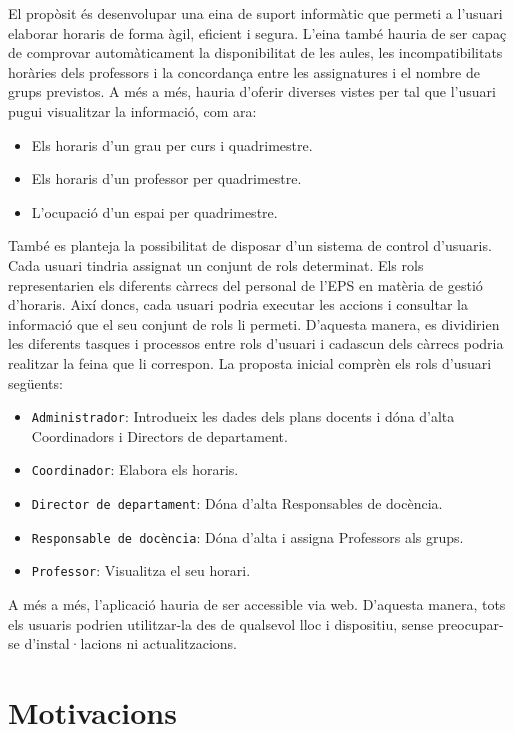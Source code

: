 \documentclass[a4paper,12pt]{ThesisStyle}
\begin{document}
El propòsit és desenvolupar una eina de suport informàtic que permeti a l'usuari elaborar horaris de forma àgil, eficient i segura. L'eina també hauria de ser capaç de comprovar automàticament la disponibilitat de les aules, les incompatibilitats horàries dels professors i la concordança entre les assignatures i el nombre de grups previstos. A més a més, hauria d'oferir diverses vistes per tal que l'usuari pugui visualitzar la informació, com ara:
\begin{itemize}
  \item Els horaris d'un grau per curs i quadrimestre.
  \item Els horaris d'un professor per quadrimestre.
  \item L'ocupació d'un espai per quadrimestre.
\end{itemize}

També es planteja la possibilitat de disposar d'un sistema de control d'usuaris. Cada usuari tindria assignat un conjunt de rols determinat. Els rols representarien els diferents càrrecs del personal de l'EPS en matèria de gestió d'horaris. Així doncs, cada usuari podria executar les accions i consultar la informació que el seu conjunt de rols li permeti. D'aquesta manera, es dividirien les diferents tasques i processos entre rols d'usuari i cadascun dels càrrecs podria realitzar la feina que li correspon. La proposta inicial comprèn els rols d'usuari següents:
\begin{itemize}
  \item \texttt{Administrador}: Introdueix les dades dels plans docents i dóna d'alta Coordinadors i Directors de departament.
  \item \texttt{Coordinador}: Elabora els horaris.
  \item \texttt{Director de departament}: Dóna d'alta Responsables de docència.
  \item \texttt{Responsable de docència}: Dóna d'alta i assigna Professors als grups.
  \item \texttt{Professor}: Visualitza el seu horari.
\end{itemize}

A més a més, l'aplicació hauria de ser accessible via web. D'aquesta manera, tots els usuaris podrien utilitzar-la des de qualsevol lloc i dispositiu, sense preocupar-se d'instal·lacions ni actualitzacions.

\section{Motivacions}
\label{sec:motivacions}
\end{document}
